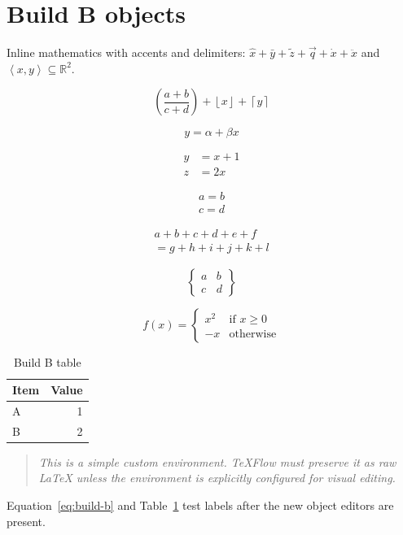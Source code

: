 \documentclass[11pt]{article}
\newenvironment{policybox}{\begin{quote}\itshape}{\end{quote}}
\begin{document}
\section{Build B objects}

Inline mathematics with accents and delimiters:
$\hat{x}+\bar{y}+\tilde{z}+\vec{q}+\dot{x}+\ddot{x}$ and
$\left\langle x,y\right\rangle \subseteq \mathbb{R}^{2}$.

\[
  \left(\frac{a+b}{c+d}\right)
  + \left\lfloor x \right\rfloor
  + \left\lceil y \right\rceil
\]

\begin{equation}
  y = \alpha + \beta x
  \label{eq:build-b}
\end{equation}

\begin{align}
  y &= x + 1 \\
  z &= 2x
\end{align}

\begin{gather*}
  a=b \\
  c=d
\end{gather*}

\begin{multline*}
  a+b+c+d+e+f \\
  = g+h+i+j+k+l
\end{multline*}

\[
\begin{Bmatrix}
  a & b \\
  c & d
\end{Bmatrix}
\]

\[
f(x)=
\begin{cases}
  x^2 & \text{if } x\ge 0 \\
  -x  & \text{otherwise}
\end{cases}
\]

\begin{table}[htbp]
\centering
\caption{Build B table}
\label{tab:build-b}
\begin{tabular}{lr}
\toprule
Item & Value \\
\midrule
A & 1 \\
B & 2 \\
\bottomrule
\end{tabular}
\end{table}

\begin{policybox}
This is a simple custom environment. TeXFlow must preserve it as raw LaTeX
unless the environment is explicitly configured for visual editing.
\end{policybox}

Equation~\eqref{eq:build-b} and Table~\ref{tab:build-b} test labels after the
new object editors are present.
\end{document}
